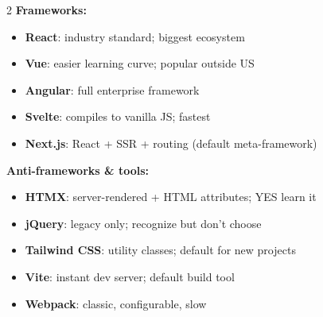 \documentclass[11pt, letterpaper]{article}
\begin{document}
\begin{tcolorbox}[colback=part4bg, colframe=sectionorange,
  title={\bfseries Frontend Ecosystem}, arc=3pt, boxrule=1pt]
\footnotesize
\begin{multicols}{2}
\textbf{Frameworks:}
\begin{itemize}[noitemsep, leftmargin=*]
  \item \textbf{React}: industry standard; biggest ecosystem
  \item \textbf{Vue}: easier learning curve; popular outside US
  \item \textbf{Angular}: full enterprise framework
  \item \textbf{Svelte}: compiles to vanilla JS; fastest
  \item \textbf{Next.js}: React + SSR + routing (default meta-framework)
\end{itemize}
\columnbreak
\textbf{Anti-frameworks \& tools:}
\begin{itemize}[noitemsep, leftmargin=*]
  \item \textbf{HTMX}: server-rendered + HTML attributes; YES learn it
  \item \textbf{jQuery}: legacy only; recognize but don't choose
  \item \textbf{Tailwind CSS}: utility classes; default for new projects
  \item \textbf{Vite}: instant dev server; default build tool
  \item \textbf{Webpack}: classic, configurable, slow
\end{itemize}
\end{multicols}
\end{tcolorbox}

\vspace{4pt}
\end{document}
